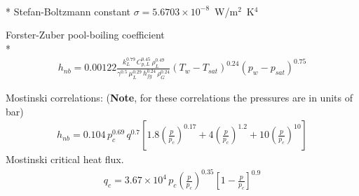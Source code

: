 \documentclass[calculator,datasheet,handbook]{exam}
\begin{document}
\begin{datasheet}
  \\*
  Stefan-Boltzmann constant $\sigma=5.6703\times10^{-8}$~W/m${}^2$~K${}^4$
  
  Forster-Zuber pool-boiling coefficient\\*
  \begin{align*}
    h_{nb}=0.00122\frac{k_L^{0.79}\, C_{p,L}^{0.45}\, \rho_L^{0.49}}{\gamma^{0.5}\,\mu_L^{0.29}\,h_{fg}^{0.24}\,\rho_G^{0.24}}\left(T_w - T_{sat}\right)^{0.24}\left(p_w-p_{sat}\right)^{0.75}
  \end{align*}

  Mostinski correlations: ({\bf Note}, for these correlations the
  pressures are in units of bar)
  \begin{align*}
    h_{nb} = 0.104\,p_c^{0.69}\,q^{0.7}\left[1.8\left(\frac{p}{p_c}\right)^{0.17}+4\left(\frac{p}{p_c}\right)^{1.2}+10\left(\frac{p}{p_c}\right)^{10}\right]
  \end{align*}
  Mostinski critical heat flux.
  \begin{align*}
    q_c = 3.67\times10^4\,p_c\left(\frac{p}{p_c}\right)^{0.35}\left[1-\frac{p}{p_c}\right]^{0.9}
  \end{align*}


\end{datasheet}
\end{document}
